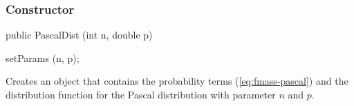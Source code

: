 \subsubsection* {Constructor}
\begin{code}

   public PascalDist (int n, double p)\begin{hide} {
      setParams (n, p);
   }\end{hide}
\end{code}
 \begin{tabb}
   Creates an object that contains the probability
   terms (\ref{eq:fmass-pascal}) and the distribution function for
   the Pascal distribution with parameter $n$ and $p$.
 \end{tabb}

